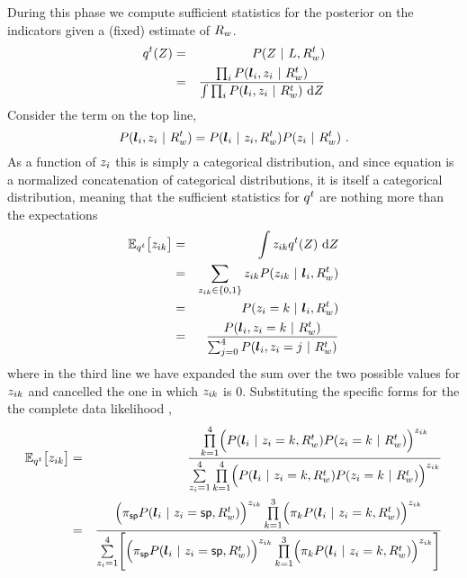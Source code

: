 During this phase we compute sufficient statistics for the posterior on
the indicators given a (fixed) estimate of $\SceneR$.
\begin{eqnarray}
  \PosteriorEst^t(\Indicators) &=&
    P(\Indicators ~|~ \LineSegs,\SceneR^t) \\
  \label{eq:posterior-est}
  &=&
    \frac{
      \prod_i P(\LineSeg_i,\Indicator_i ~|~\SceneR^t)
    }{
      \int \prod_i P(\LineSeg_i,\Indicator_i ~|~ \SceneR^t)
      ~\intd\Indicators
    }\\
\end{eqnarray}
Consider the term on the top line,
\begin{equation}
  P(\LineSeg_i,\Indicator_i ~|~\SceneR^t)
  =
  P(\LineSeg_i ~|~ \Indicator_i,\SceneR^t)
  P(\Indicator_i ~|~ \SceneR^t) ~.
\end{equation}
As a function of $\Indicator_i$ this is simply a categorical
distribution, and since equation  is a
normalized concatenation of categorical distributions, it is
itself a categorical distribution, meaning that the sufficient
statistics for $\PosteriorEst^t$ are nothing more than the
expectations
\begin{eqnarray}
  \Expected_{\PosteriorEst^t}\bigl[ \Indicator_{ik} \bigr]
  &=& 
    \int \Indicator_{ik} \PosteriorEst^t(\Indicators) ~\intd\Indicators \\
  &=& 
    \sum_{\Indicator_{ik}\in\{0,1\}}
    \Indicator_{ik} P(\Indicator_{ik} ~|~ \LineSeg_i, \SceneR^t)\\
  &=&
    P(\Indicator_i=k ~|~ \LineSeg_i, \SceneR^t)\\
  &=&
    \label{eq:expected-zik}
    \frac
        {P( \LineSeg_i, \Indicator_i=k ~|~ \SceneR^t)}
        {\sum_{j=0}^4 P(\LineSeg_i, \Indicator_i=j ~|~ \SceneR^t)}
\end{eqnarray}
where in the third line we have expanded the sum over the two possible
values for $\Indicator_{ik}$ and cancelled the one in which
$\Indicator_{ik}$ is 0. Substituting the specific forms for the the
complete data likelihood ,
\begin{eqnarray}
  \Expected_{\PosteriorEst^t}\bigl[ \Indicator_{ik} \bigr] 
  &=&
  \frac{
    \prod_{k=1}^4\limits \Bigl( 
      P(\LineSeg_i ~|~ \Indicator_i=k,\SceneR^t)
      P(\Indicator_i=k ~|~ \SceneR^t)
    \Bigr)^{\Indicator_{ik}}
  }{
    \sum_{\Indicator_i=1}^4\limits
    \prod_{k=1}^4\limits \Bigl( 
      P(\LineSeg_i ~|~ \Indicator_i=k,\SceneR^t)
      P(\Indicator_i=k ~|~ \SceneR^t)
    \Bigr)^{\Indicator_{ik}}
  }\\
  \label{eq:big-expectation}
  &=&
  \frac{
    \Bigl(
      \Mixing_{\Spurious}
      P(\LineSeg_i ~|~ \Indicator_i=\Spurious,\SceneR^t)
    \Bigr)^{\Indicator_{ik}}
    \prod_{k=1}^3\limits \Bigl(
      \Mixing_k
      P(\LineSeg_i ~|~ \Indicator_i=k,\SceneR^t)
    \Bigr)^{\Indicator_{ik}}
  }{
    \sum_{\Indicator_i=1}^4\limits \Biggl[
    \Bigl(
      \Mixing_{\Spurious}
      P(\LineSeg_i ~|~ \Indicator_i=\Spurious,\SceneR^t)
    \Bigr)^{\Indicator_{ik}}
    \prod_{k=1}^3\limits \Bigl( 
      \Mixing_k
      P(\LineSeg_i ~|~ \Indicator_i=k,\SceneR^t)
    \Bigr)^{\Indicator_{ik}}
    \Biggr]
  }
\end{eqnarray}
